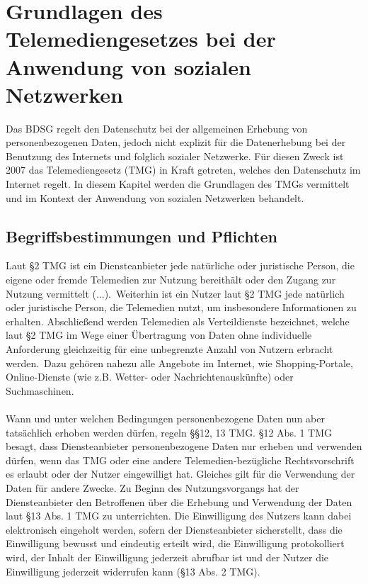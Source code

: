 \chapter{Grundlagen des Telemediengesetzes bei der Anwendung von sozialen Netzwerken}
Das BDSG regelt den Datenschutz bei der allgemeinen Erhebung von personenbezogenen Daten, jedoch nicht explizit für die Datenerhebung bei der Benutzung des Internets und folglich sozialer Netzwerke. Für diesen Zweck ist 2007 das Telemediengesetz (\acs{TMG}) in Kraft getreten, welches den Datenschutz im Internet regelt.\autocite[vgl.][]{klicksafe.de} \autocite[vgl.][]{shr.de} In diesem Kapitel werden die Grundlagen des TMGs vermittelt und im Kontext der Anwendung von sozialen Netzwerken behandelt.
\section{Begriffsbestimmungen und Pflichten}
Laut \S 2 TMG ist ein Diensteanbieter \glqq jede natürliche oder juristische Person, die eigene oder fremde Telemedien zur Nutzung bereithält oder den Zugang zur Nutzung vermittelt (...).\grqq \ Weiterhin ist ein Nutzer laut \S 2 TMG jede natürlich oder juristische Person, die Telemedien nutzt, um insbesondere Informationen zu erhalten. Abschließend werden Telemedien als Verteildienste bezeichnet, welche laut \S 2 TMG \glqq im Wege einer Übertragung von Daten ohne individuelle Anforderung gleichzeitig für eine unbegrenzte Anzahl von Nutzern erbracht werden.\grqq \ Dazu gehören nahezu alle Angebote im Internet, wie Shopping-Portale, Online-Dienste (wie z.B. Wetter- oder Nachrichtenauskünfte) oder Suchmaschinen.\autocite[vgl.][]{shr.de}\\
\\Wann und unter welchen Bedingungen personenbezogene Daten nun aber tatsächlich erhoben werden dürfen, regeln \S\S 12, 13 TMG.  \S 12 Abs. 1 TMG besagt, dass Diensteanbieter personenbezogene Daten nur erheben und verwenden dürfen, wenn das TMG oder eine andere Telemedien-bezügliche Rechtsvorschrift es erlaubt oder der Nutzer eingewilligt hat. Gleiches gilt für die Verwendung der Daten für andere Zwecke. Zu Beginn des Nutzungsvorgangs hat der Diensteanbieter den Betroffenen über die Erhebung und Verwendung der Daten laut \S 13 Abs. 1 TMG zu unterrichten. Die Einwilligung des Nutzers kann dabei elektronisch eingeholt werden, sofern der Diensteanbieter sicherstellt, dass die Einwilligung bewusst und eindeutig erteilt wird, die Einwilligung protokolliert wird, der Inhalt der Einwilligung jederzeit abrufbar ist und der Nutzer die Einwilligung jederzeit widerrufen kann (\S 13 Abs. 2 TMG).
